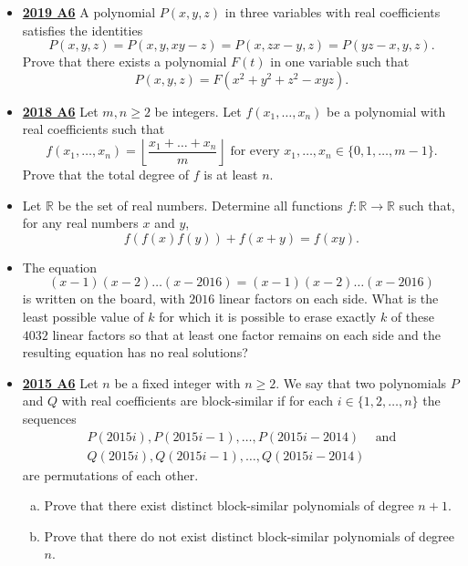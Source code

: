 \documentclass[11pt]{scrartcl}
\begin{document}
\begin{itemize}[leftmargin=*]
\item \href{https://artofproblemsolving.com/community/c6h2278982p17828583}{\textbf{2019 A6}} 	A polynomial $P(x, y, z)$ in three variables with real coefficients satisfies the identities
$$P(x, y, z)=P(x, y, xy-z)=P(x, zx-y, z)=P(yz-x, y, z).$$
Prove that there exists a polynomial $F(t)$ in one variable such that
$$P(x,y,z)=F(x^2+y^2+z^2-xyz).$$
\item \href{https://artofproblemsolving.com/community/c6h1876783p12752880}{\textbf{2018 A6}} 	Let $m,n\geqslant  2$ be integers. Let $f(x_1,\dots, x_n)$ be a polynomial with real coefficients such that$$f(x_1,\dots, x_n)=\left\lfloor \frac{x_1+\dots + x_n}{m} \right\rfloor\text{ for every } x_1,\dots, x_n\in \{0,1,\dots, m-1\}.$$Prove that the total degree of $f$ is at least $n$.
\item {} Let $\mathbb{R}$ be the set of real numbers. Determine all functions $f: \mathbb{R} \rightarrow \mathbb{R}$ such that, for any real numbers $x$ and $y$,\[ f(f(x)f(y)) + f(x+y) = f(xy). \]
\item {} The equation
$$(x-1)(x-2)\dots(x-2016)=(x-1)(x-2)\dots (x-2016)$$is written on the board, with $2016$ linear factors on each side. What is the least possible value of $k$ for which it is possible to erase exactly $k$ of these $4032$ linear factors so that at least one factor remains on each side and the resulting equation has no real solutions?
\item \href{https://artofproblemsolving.com/community/c6h1268901p6622740}{\textbf{2015 A6}} Let $n$ be a fixed integer with $n \geqslant 2$. We say that two polynomials $P$ and $Q$ with real coefficients are block-similar if for each $i \in \{1, 2, \dots, n\}$ the sequences
\begin{eqnarray*}
P(2015i), P(2015i - 1), \dots, P(2015i - 2014) & \text{and}\\
Q(2015i), Q(2015i - 1), \dots, Q(2015i - 2014)
\end{eqnarray*}
are permutations of each other. 
\begin{enumerate}[(a)]
    \item Prove that there exist distinct block-similar polynomials of degree $n + 1$. 
    \item Prove that there do not exist distinct block-similar polynomials of degree $n$. 
\end{enumerate}

\end{itemize}
\end{document}
